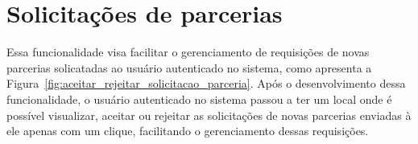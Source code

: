 \section{Solicitações de parcerias}

Essa funcionalidade visa facilitar o gerenciamento de requisições de novas parcerias solicatadas ao usuário autenticado no sistema, como apresenta a Figura~\ref{fig:aceitar_rejeitar_solicitacao_parceria}. Após o desenvolvimento dessa funcionalidade, o usuário autenticado no sistema passou a ter um local onde é possível visualizar, aceitar ou rejeitar as solicitações de novas parcerias enviadas à ele apenas com um clique, facilitando o gerenciamento dessas requisições.
